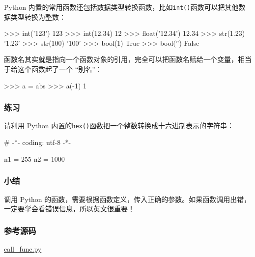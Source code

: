 Python
内置的常用函数还包括数据类型转换函数，比如\texttt{int()}函数可以把其他数据类型转换为整数：

\begin{pythoncode}
>>> int('123')
123
>>> int(12.34)
12
>>> float('12.34')
12.34
>>> str(1.23)
'1.23'
>>> str(100)
'100'
>>> bool(1)
True
>>> bool('')
False
\end{pythoncode}

函数名其实就是指向一个函数对象的引用，完全可以把函数名赋给一个变量，相当于给这个函数起了一个
``别名''：

\begin{pythoncode}
>>> a = abs 
>>> a(-1) 
1
\end{pythoncode}

\hypertarget{ux7ec3ux4e60}{%
\subsubsection{练习}\label{ux7ec3ux4e60}}

请利用 Python
内置的\texttt{hex()}函数把一个整数转换成十六进制表示的字符串：

\begin{pythoncode}
# -*- coding: utf-8 -*-

n1 = 255
n2 = 1000
\end{pythoncode}

\hypertarget{ux5c0fux7ed3}{%
\subsubsection{小结}\label{ux5c0fux7ed3}}

调用 Python
的函数，需要根据函数定义，传入正确的参数。如果函数调用出错，一定要学会看错误信息，所以英文很重要！

\hypertarget{ux53c2ux8003ux6e90ux7801}{%
\subsubsection{参考源码}\label{ux53c2ux8003ux6e90ux7801}}

\href{https://github.com/michaelliao/learn-python3/blob/master/samples/function/call_func.py}{call\_func.py}

